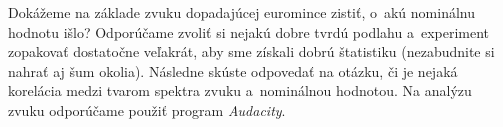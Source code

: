 \createTaskHeader[Mincohodnotometer]
Dokážeme na základe zvuku dopadajúcej euromince zistiť, o~akú nominálnu hodnotu išlo?
Odporúčame zvoliť si nejakú dobre tvrdú podlahu a~experiment zopakovať dostatočne veľakrát,
aby sme získali dobrú štatistiku (nezabudnite si nahrať aj šum okolia).
Následne skúste odpovedať na otázku, či je nejaká korelácia medzi tvarom spektra zvuku a~nominálnou hodnotou.
Na analýzu zvuku odporúčame použiť program \emph{Audacity}. 
